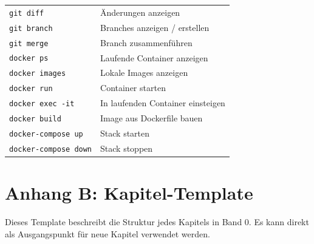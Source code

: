 \begin{tabularx}{\textwidth}{@{}lX@{}}
\texttt{git diff}   & Änderungen anzeigen \\
\texttt{git branch} & Branches anzeigen / erstellen \\
\texttt{git merge}  & Branch zusammenführen \\
\midrule
\texttt{docker ps}           & Laufende Container anzeigen \\
\texttt{docker images}       & Lokale Images anzeigen \\
\texttt{docker run}          & Container starten \\
\texttt{docker exec -it}     & In laufenden Container einsteigen \\
\texttt{docker build}        & Image aus Dockerfile bauen \\
\texttt{docker-compose up}   & Stack starten \\
\texttt{docker-compose down} & Stack stoppen \\
\bottomrule
\end{tabularx}

\chapter{Anhang B: Kapitel-Template}

Dieses Template beschreibt die Struktur jedes Kapitels in Band 0.
Es kann direkt als Ausgangspunkt für neue Kapitel verwendet werden.

